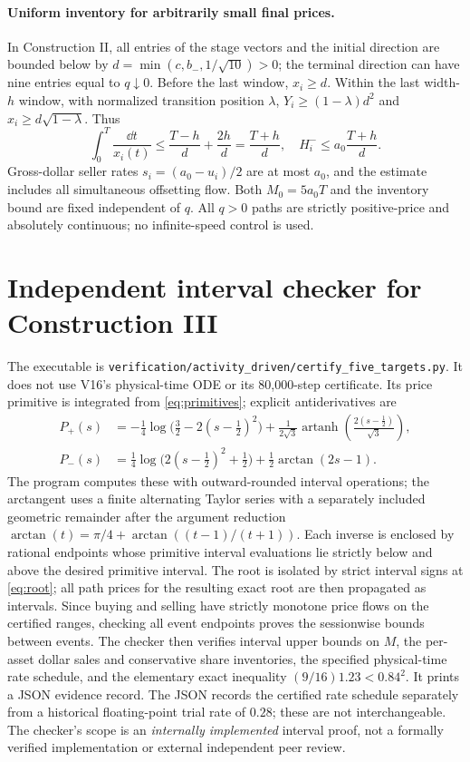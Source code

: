 \documentclass[review,hidelinks,onefignum,onetabnum]{siamonline250211}%
\begin{document}
\paragraph{Uniform inventory for arbitrarily small final prices.}
In Construction II, all entries of the stage vectors and the
initial direction are bounded below by
$d=\min(c,b_-,1/\sqrt{10})>0$; the terminal direction can have
nine entries equal to $q\downarrow0$. Before the last window,
$x_i\ge d$. Within the last width-$h$ window, with normalized
transition position $\lambda$, $Y_i\ge(1-\lambda)d^2$ and
$x_i\ge d\sqrt{1-\lambda}$. Thus
\begin{equation}\label{eq:uniformstock}
 \int_0^T\frac{\dd t}{x_i(t)}
 \le\frac{T-h}{d}+\frac{2h}{d}=\frac{T+h}{d},\quad
 H_i^-\le a_0\frac{T+h}{d}.
\end{equation}
Gross-dollar seller rates $s_i=(a_0-u_i)/2$ are at most $a_0$,
and the estimate includes all simultaneous offsetting flow.
Both $M_0=5a_0T$ and the inventory bound are fixed independent
of $q$. All $q>0$ paths are strictly positive-price and
absolutely continuous; no infinite-speed control is used.

\section{Independent interval checker for Construction III}\label{app:interval}
The executable is
\texttt{verification/activity\_driven/certify\_five\_targets.py}.
It does not use V16's physical-time ODE or its 80,000-step
certificate. Its price primitive is integrated from
\eqref{eq:primitives}; explicit antiderivatives are
\begin{align*}
 P_+(s)&=-\frac14\log\bigl(\tfrac32-2(s-\tfrac12)^2\bigr)
 +\frac1{2\sqrt3}\operatorname{artanh}
   \!\left(\frac{2(s-\tfrac12)}{\sqrt3}\right),\\
 P_-(s)&=\frac14\log\bigl(2(s-\tfrac12)^2+\tfrac12\bigr)
 +\frac12\arctan(2s-1).
\end{align*}
The program computes these with outward-rounded interval
operations; the arctangent uses a finite alternating Taylor series
with a separately included geometric remainder after the
argument reduction $\arctan(t)=\pi/4+\arctan((t-1)/(t+1))$.
Each inverse is enclosed by rational endpoints whose primitive
interval evaluations lie strictly below and above the desired
primitive interval. The root is isolated by strict interval signs
at \eqref{eq:root}; all path prices for the resulting exact root
are then propagated as intervals. Since buying and selling have
strictly monotone price flows on the certified ranges, checking
all event endpoints proves the sessionwise bounds between events.
The checker then verifies interval upper bounds on $M$, the
per-asset dollar sales and conservative share inventories, the
specified physical-time rate schedule, and the elementary exact
inequality $(9/16)1.23<0.84^2$. It prints a JSON evidence record.
The JSON records the certified rate schedule separately from a
historical floating-point trial rate of $0.28$; these are not
interchangeable. The checker's scope is an \emph{internally
implemented} interval proof, not a formally verified implementation
or external independent peer review.


\enlargethispage{2\baselineskip}
{\small}
\end{document}
